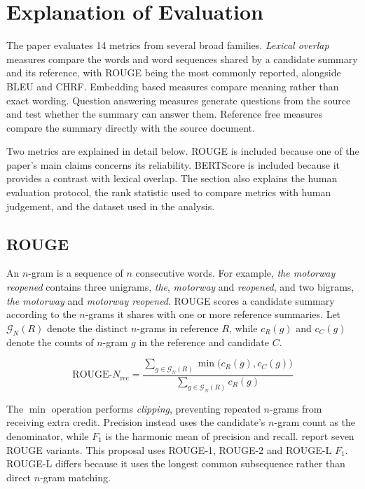 \documentclass[11pt]{article}
\begin{document}
\section{Explanation of Evaluation}
\label{sec:eval}

The paper evaluates 14 metrics from several broad families. \emph{Lexical overlap} measures compare the words and word sequences shared by a candidate summary and its reference, with ROUGE being the most commonly reported, alongside BLEU and CHRF. Embedding based measures compare meaning rather than exact wording. Question answering measures generate questions from the source and test whether the summary can answer them. Reference free measures compare the summary directly with the source document.

Two metrics are explained in detail below. ROUGE is included because one of the paper's main claims concerns its reliability. BERTScore is included because it provides a contrast with lexical overlap. The section also explains the human evaluation protocol, the rank statistic used to compare metrics with human judgement, and the dataset used in the analysis.

\subsection{ROUGE}
\label{sec:rouge}

An $n$-gram is a sequence of $n$ consecutive words. For example, \textit{the motorway reopened} contains three unigrams, \textit{the}, \textit{motorway} and \textit{reopened}, and two bigrams, \textit{the motorway} and \textit{motorway reopened}. ROUGE \citep{lin-2004-rouge} scores a candidate summary according to the $n$-grams it shares with one or more reference summaries. Let $\mathcal{G}_N(R)$ denote the distinct $n$-grams in reference $R$, while $c_R(g)$ and $c_C(g)$ denote the counts of $n$-gram $g$ in the reference and candidate $C$.

\begin{equation}
  \label{eq:rouge}
  \text{ROUGE-}N_{\text{rec}} =
  \frac{\sum_{g \in \mathcal{G}_N(R)} \min\big(c_R(g), c_C(g)\big)}
       {\sum_{g \in \mathcal{G}_N(R)} c_R(g)}
\end{equation}

\noindent The $\min$ operation performs \emph{clipping}, preventing repeated $n$-grams from receiving extra credit. Precision instead uses the candidate's $n$-gram count as the denominator, while $F_1$ is the harmonic mean of precision and recall. \citet{fabbri-etal-2021-summeval} report seven ROUGE variants. This proposal uses ROUGE-1, ROUGE-2 and ROUGE-L $F_1$. ROUGE-L differs because it uses the longest common subsequence rather than direct $n$-gram matching.
\end{document}
